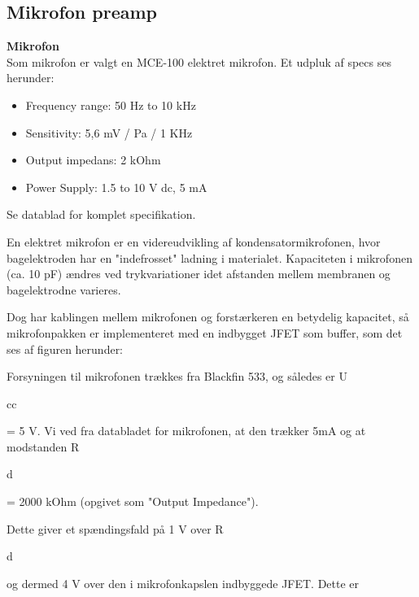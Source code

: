 
\subsection{Mikrofon preamp}

\textbf{Mikrofon} \\
Som mikrofon er valgt en MCE-100 elektret mikrofon. Et udpluk af specs ses herunder:
\begin{itemize}
	\item Frequency range: 50 Hz to 10 kHz
	\item Sensitivity: 5,6 mV / Pa / 1 KHz
	\item Output impedans: 2 kOhm
	\item Power Supply: 1.5 to 10 V dc, 5 mA
\end{itemize}
Se datablad for komplet specifikation. 

En elektret mikrofon er en videreudvikling af kondensatormikrofonen, hvor bagelektroden har en "indefrosset" ladning i materialet. Kapaciteten i mikrofonen (ca. 10 pF) ændres ved trykvariationer idet afstanden mellem membranen og bagelektrodne varieres. 


Dog har kablingen mellem mikrofonen og forstærkeren en betydelig kapacitet, så mikrofonpakken er implementeret med en indbygget JFET som buffer, som det ses af figuren herunder:

Forsyningen til mikrofonen trækkes fra Blackfin 533, og således er U\begin{tiny}cc\end{tiny} = 5 V. 
Vi ved fra databladet for mikrofonen, at den trækker 5mA og at modstanden R\begin{tiny}d\end{tiny} = 2000 kOhm (opgivet som "Output Impedance").

Dette giver et spændingsfald på 1 V over R\begin{tiny}d\end{tiny} og dermed 4 V over den i mikrofonkapslen indbyggede JFET. Dette er 
